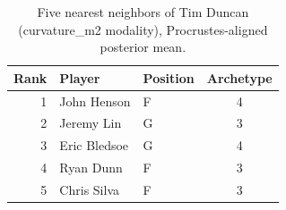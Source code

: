 \begin{table}[htbp]
  \centering\small
  \begin{tabular}{rllc}
    \toprule
    Rank & Player & Position & Archetype \\
    \midrule
    1 & John Henson & F & 4 \\
    2 & Jeremy Lin & G & 3 \\
    3 & Eric Bledsoe & G & 4 \\
    4 & Ryan Dunn & F & 3 \\
    5 & Chris Silva & F & 3 \\
    \bottomrule
  \end{tabular}
  \caption{Five nearest neighbors of Tim Duncan (curvature_m2 modality), Procrustes-aligned posterior mean.}
  \label{tab:Tim_Duncan_neighbors_curvature_m2}
\end{table}

